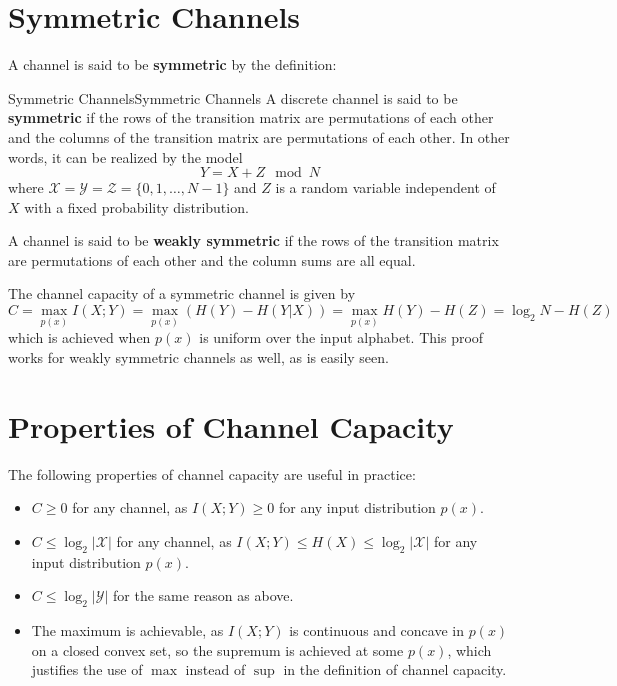\documentclass[../main.tex]{subfiles}
\begin{document}
\section{Symmetric Channels}
A channel is said to be \textbf{symmetric} by the definition:
\begin{definition}{Symmetric Channels}{Symmetric Channels}
	A discrete channel is said to be \textbf{symmetric} if the rows of the transition matrix are permutations of each other and the columns of the transition matrix are permutations of each other. In other words, it can be realized by the model
	\begin{equation}
		Y = X + Z \mod N
	\end{equation}
	where $\mathcal{X} = \mathcal{Y} = \mathcal{Z} = \{0, 1, \ldots, N-1\}$ and $Z$ is a random variable independent of $X$ with a fixed probability distribution.

	A channel is said to be \textbf{weakly symmetric} if the rows of the transition matrix are permutations of each other and the column sums are all equal.
\end{definition}

The channel capacity of a symmetric channel is given by
\begin{equation}
	C = \max_{p(x)} I(X;Y) = \max_{p(x)} (H(Y) - H(Y|X)) = \max_{p(x)} H(Y) - H(Z) = \log_2 N - H(Z)
\end{equation}
which is achieved when $p(x)$ is uniform over the input alphabet. This proof works for weakly symmetric channels as well, as is easily seen.

\section{Properties of Channel Capacity}
The following properties of channel capacity are useful in practice:
\begin{itemize}
	\item $C \geq 0$ for any channel, as $I(X;Y) \geq 0$ for any input distribution $p(x)$.
	\item $C \leq \log_2 |\mathcal{X}|$ for any channel, as $I(X;Y) \leq H(X) \leq \log_2 |\mathcal{X}|$ for any input distribution $p(x)$.
	\item $C \leq \log_2 |\mathcal{Y}|$ for the same reason as above.
	\item The maximum is achievable, as $I(X;Y)$ is continuous and concave in $p(x)$ on a closed convex set, so the supremum is achieved at some $p(x)$, which justifies the use of $\max$ instead of $\sup$ in the definition of channel capacity.
\end{itemize}
\end{document}

